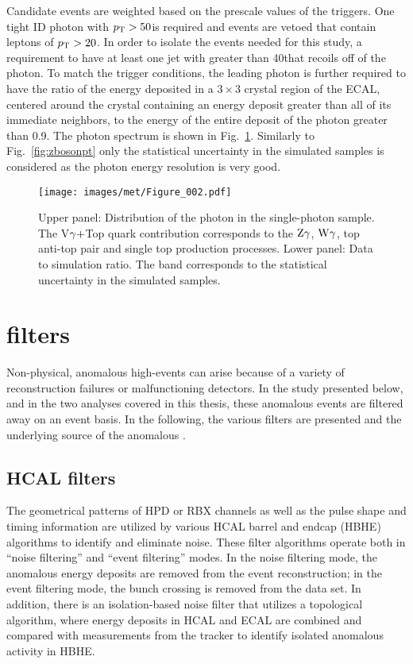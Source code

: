 Candidate events are weighted based on the prescale values of the triggers.
One tight ID photon with $p_{\mathrm{T}} > 50$\GeV is required and events are vetoed that contain leptons of $p_{\mathrm{T}} > 20$\GeV. 
In order to isolate the events needed for this study, a requirement to have at least one jet with \pt greater than 40\GeV that recoils off of the photon. 
To match the trigger conditions, the leading photon is further required to have the ratio of the energy deposited in a $3\times3$ crystal region of the ECAL, centered around the crystal containing an energy deposit greater than all of its immediate neighbors, to the energy of the entire deposit of the photon greater than 0.9.
The photon \qt spectrum is shown in Fig.~\ref{fig:gbosonpt}. 
Similarly to Fig.~\ref{fig:zbosonpt} only the statistical uncertainty in the simulated samples is considered as the photon energy resolution is very good.
\begin{figure}[!htb]
  \centering
  \texttt{[image: images/met/Figure\_002.pdf]}
  \caption{Upper panel: Distribution of the photon \qt in the single-photon sample. The V$\gamma+$Top quark contribution corresponds to the $\mathrm{Z}\gamma$, $\mathrm{W}\gamma$, top anti-top pair and single top production processes. Lower panel: Data to simulation ratio. The band corresponds to the statistical uncertainty in the simulated samples.  }
  \label{fig:gbosonpt}
\end{figure}                                                                                                                                                                 
\section{\ptmiss filters}                                                                                                                                     
\noindent
\justify
\label{sec:filters}
Non-physical, anomalous high-\ptmiss events can arise because of a variety of reconstruction failures or malfunctioning detectors.  
In the \ptmiss study presented below, and in the two analyses covered in this thesis, these anomalous \ptmiss events are filtered away on an event basis. 
In the following, the various filters are presented and the underlying source of the anomalous \ptmiss. 
\subsection*{HCAL filters}
\noindent
\justify
The geometrical patterns of HPD or RBX channels as well as the pulse shape and timing information are utilized by various HCAL barrel and endcap (HBHE) algorithms to identify and eliminate noise. 
These filter algorithms operate both in ``noise filtering'' and ``event filtering'' modes.
In the noise filtering mode, the anomalous energy deposits are removed from the event reconstruction; in the event filtering mode, the bunch crossing is removed from the data set. 
In addition, there is an isolation-based noise filter that utilizes a topological algorithm, where energy deposits in HCAL and ECAL are combined
and compared with measurements from the tracker to identify isolated anomalous activity in HBHE. 
